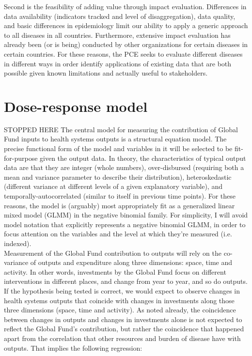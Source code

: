 \documentclass[twocolumn]{bmcart}%
\begin{document}
Second is the feasibility of adding value through impact evaluation. Differences in data availability (indicators tracked and level of disaggregation), data quality, and basic differences in epidemiology limit our ability to apply a generic approach to all diseases in all countries. Furthermore, extensive impact evaluation has already been (or is being) conducted by other organizations for certain diseases in certain countries. For these reasons, the PCE seeks to evaluate different diseases in different ways in order identify applications of existing data that are both possible given known limitations and actually useful to stakeholders. \\

\section{Dose-response model}
STOPPED HERE
The central model for measuring the contribution of Global Fund inputs to health systems outputs is a structural equation model. The precise functional form of the model and variables in it will be selected to be fit-for-purpose given the output data. In theory, the characteristics of typical output data are that they are integer (whole numbers), over-disbursed (requiring both a mean and variance parameter to describe their distribution), heteroskedastic (different variance at different levels of a given explanatory variable), and temporally-autocorrelated (similar to itself in previous time points). For these reasons, the model is (arguably) most appropriately fit as a generalized linear mixed model (GLMM) in the negative binomial family. For simplicity, I will avoid model notation that explicitly represents a negative binomial GLMM, in order to focus attention on the variables and the level at which they're measured (i.e. indexed). \\

Measurement of the Global Fund contribution to outputs will rely on the co-variance of outputs and expenditure along three dimensions: space, time and activity. In other words, investments by the Global Fund focus on different interventions in different places, and change from year to year, and so do outputs. If the hypothesis being tested is correct, we would expect to observe changes in health systems outputs that coincide with changes in investments along those three dimensions (space, time and activity). As noted already, the coincidence between changes in outputs and changes in investments alone is not expected to reflect the Global Fund's contribution, but rather the coincidence that happened apart from the correlation that other resources and burden of disease have with outputs. That implies the following regression:
\end{document}
